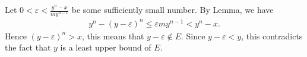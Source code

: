 \documentclass{book}
\begin{document}
\begin{enumerate}
    Let $0<\varepsilon<\frac{y^n-x}{my^{n-1}}$ be some sufficiently small number. By Lemma,  we have
    \begin{align*}
        y^n-(y-\varepsilon)^n\leq\varepsilon my^{n-1}<y^n-x.
    \end{align*}
    Hence $(y-\varepsilon)^n>x$, this means that $y-\varepsilon\notin E$. Since $y-\varepsilon<y$, this contradicts the fact that $y$ is a least upper bound of $E$.
\begin{comment}
    The identity
        \begin{align*}
            b^n-a^n=(b-a)(b^{n-1}+b^{n-2}a+\cdots+a^{n-1})
        \end{align*}
    yields the inequality
        \begin{align*}
            b^n-a^n<(b-a)mb^{n-1}
        \end{align*}
    when $0<a<b$ and $n\leq m$.
    
    Suppose for contradiction that $y^n\neq x$. Then we divide into two cases that $y^n<x$ or $y^n>x$. Suppose that we are in the case where $y^n<x$, then $x-y^n>0$. By the Archimedean property, there exists an integer $m$ such that
        \begin{align*}
            0<x-y^n<m(y+1)^n\implies 0<\frac{x-y^n}{m(y+1)^{n-1}}<1.
        \end{align*}
    
    Let $\displaystyle 0<k<\frac{y^n-x}{m(y+1)^{n-1}}$. By the former inequality, we conclude that
        \begin{align*}
            (y+k)^n-y^n<km(y+k)^{n-1}<km(y+1)^{n-1}<x-y^n.
        \end{align*}
    
    Then $(y+k)^n<x$, we know that $y+k\in E$. But $y$ is the least upper bound for $E$, and $y<y+k$, this means that $y+k\notin E$, a contradiction.
    
    Now suppose that we are in the case where $y^n>x$, then $y^n-x>0$. By the Archimedean property, there exists an integer $m$ such that
        \begin{align*}
             0<y^n-x<my^n\implies 0<\frac{y^n-x}{my^{n-1}}<y.
        \end{align*}
    
    Let $\displaystyle k=\frac{y^n-x}{my^{n-1}}$, then we know that $k\in E$. By the former inequality, we conclude that
        \begin{align*}
            y^n-(y-k)^n<kmy^{n-1}=y^n-x.
        \end{align*}
    

\end{comment}
\end{enumerate}
\end{document}
